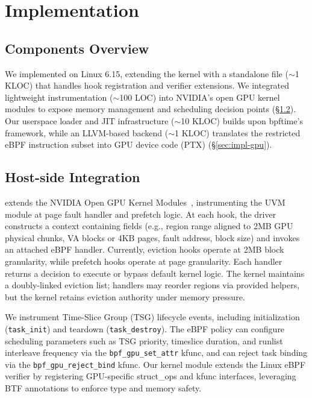 
\section{Implementation}
\label{sec:implementation}

\subsection{Components Overview}

We implemented \sys on Linux 6.15, extending the kernel with a standalone file ($\sim$1 KLOC) that handles hook registration and verifier extensions. We integrated lightweight instrumentation ($\sim$100 LOC) into NVIDIA's open GPU kernel modules to expose memory management and scheduling decision points (\S\ref{sec:impl-host}). Our userspace loader and JIT infrastructure ($\sim$10 KLOC) builds upon bpftime's framework, while an LLVM-based backend ($\sim$1 KLOC) translates the restricted \sys eBPF instruction subset into GPU device code (PTX) (\S\ref{sec:impl-gpu}).

\subsection{Host-side Integration}
\label{sec:impl-host}

\sys extends the NVIDIA Open GPU Kernel Modules~\cite{nvidia-open-gpu}, instrumenting the UVM module at page fault handler and prefetch logic. At each hook, the driver constructs a context containing fields (e.g., region range aligned to 2MB GPU physical chunks, VA blocks or 4KB pages, fault address, block size) and invokes an attached eBPF handler. Currently, eviction hooks operate at 2MB block granularity, while prefetch hooks operate at page granularity. Each handler returns a decision to execute or bypass default kernel logic. The kernel maintains a doubly-linked eviction list; handlers may reorder regions via provided helpers, but the kernel retains eviction authority under memory pressure.

We instrument Time-Slice Group (TSG) lifecycle events, including initialization (\texttt{task\_init}) and teardown (\texttt{task\_destroy}). The eBPF policy can configure scheduling parameters such as TSG priority, timeslice duration, and runlist interleave frequency via the \texttt{bpf\_gpu\_set\_attr} kfunc, and can reject task binding via the \texttt{bpf\_gpu\_reject\_bind} kfunc. Our kernel module extends the Linux eBPF verifier by registering GPU-specific struct\_ops and kfunc interfaces, leveraging BTF annotations to enforce type and memory safety.

